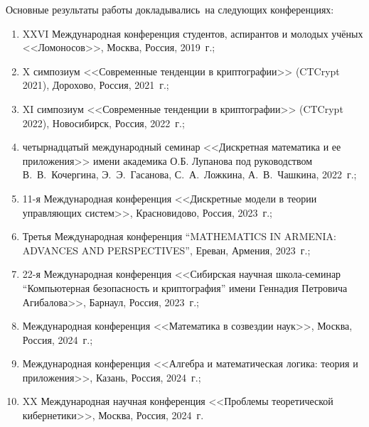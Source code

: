 {\probation}
Основные результаты работы докладывались~на следующих конференциях:
\begin{enumerate}
    \item XXVI Международная конференция студентов, аспирантов и молодых учёных <<Ломоносов>>, Москва, Россия, 2019~г.;

    \item X симпозиум <<Современные тенденции в криптографии>> (CTCrypt 2021), Дорохово, Россия, 2021~г.;

    \item XI симпозиум <<Современные тенденции в криптографии>> (CTCrypt 2022), Новосибирск, Россия, 2022~г.;

    \item четырнадцатый международный семинар <<Дискретная математика и ее приложения>> имени академика О.Б. Лупанова под руководством В.~В.~Кочергина, Э.~Э.~Гасанова, С.~А.~Ложкина, А.~В.~Чашкина, 2022~г.;

    \item 11-я Международная конференция <<Дискретные модели в теории управляющих систем>>, Красновидово, Россия, 2023~г.;

    \item Третья Международная конференция ``MATHEMATICS IN ARMENIA: ADVANCES AND PERSPECTIVES'', Ереван, Армения, 2023~г.;

    \item 22-я Международная конференция <<Сибирская научная школа-семинар ``Компьютерная безопасность и криптография'' имени Геннадия Петровича Агибалова>>, Барнаул, Россия, 2023~г.;

    \item Международная конференция <<Математика в созвездии наук>>, Москва, Россия, 2024~г.;

    \item Международная конференция <<Алгебра и математическая логика: теория и приложения>>, Казань, Россия, 2024~г.;

    \item XX Международная научная конференция <<Проблемы теоретической кибернетики>>, Москва, Россия, 2024~г.
\end{enumerate}

